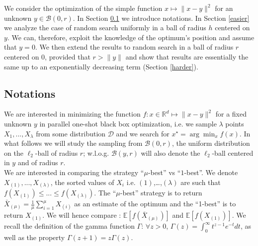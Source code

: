 We consider the optimization of the simple function $x\mapsto \lVert x-y\rVert ^2$ for an unknown $y\in \mathcal{B}(0,r)$.
In Section \ref{notations} we introduce notations.
In Section \ref{easier} we analyze the case of random search uniformly in a ball of radius $h$ centered on $y$. {We can, therefore, exploit the knowledge of the optimum's position and assume that $y=0$.} We then extend the results to random search in a ball of radius $r$ centered on $0$, provided that $r>\rVert y\rVert $ and show that results are essentially the same up to an exponentially decreasing term (Section \ref{harder}).
\subsection{Notations}\label{notations}
We are interested in minimizing the function $f:x\in\mathbb{R}^d\mapsto \lVert x-y\rVert ^2$ for a fixed unknown $y$ in parallel one-shot black box optimization, i.e. we sample $\lambda$ points $X_1,...,X_\lambda$ from some distribution $\mathcal{D}$ and we search for $x^\star = \arg\min_x f(x)$. In what follows we will study the sampling from $\mathcal{B}(0,r)$, the uniform distribution on the $\ell_2$-ball of radius $r$; w.l.o.g. $\mathcal{B}(y,r)$ will also denote the $\ell_2$-ball centered in $y$ and of radius $r$.  \\
We are interested in comparing the strategy ``$\mu$-best'' vs ``$1$-best''. We denote $X_{(1)},...,X_{(\lambda)}$, the sorted values of $X_i$ {i.e. $(1)$,\dots,$(\lambda)$ are such that} $f(X_{(1)})\leq...\leq f(X_{(\lambda)})$. The ``$\mu$-best'' strategy is to return  $\bar{X}_{(\mu)} = \frac1\mu\sum_{i=1}^\mu X_{(i)}$ as an estimate of the optimum and the ``1-best'' is to return $X_{(1)}$. We will hence compare :
$\mathbb{E}\left[f\left(\bar{X}_{(\mu)}\right)\right]$ and $\mathbb{E}\left[f\left(X_{(1)}\right)\right]$. 
We recall the definition of the gamma function $\Gamma$: $\forall z>0$, $\Gamma(z) = \int_0^{\infty}t^{z-1}e^{-t}dt$, as well as the property $\Gamma(z+1)=z\Gamma(z)$.
